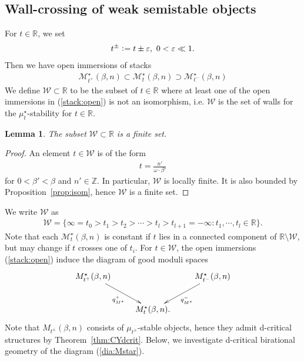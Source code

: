 \documentclass[11pt]{amsart}
\theoremstyle{plain}
\newtheorem{lem}[thm]{Lemma}
\theoremstyle{definition}
\theoremstyle{remark}
\newcommand{\mM}{\mathcal{M}}
\newcommand{\wW}{\mathcal{W}}
\begin{document}
\subsection{Wall-crossing of weak semistable objects}
For $t \in \mathbb{R}$, we set 
\begin{align*}
t^{\pm} \cneq t\pm \varepsilon, \ 0<\varepsilon \ll 1.
\end{align*}
Then we have open immersions of stacks
\begin{align}\label{stack:open}
\mM_{t^{+}}^{\star}(\beta, n) \subset \mM_t^{\star}(\beta, n)
\supset \mM_{t^{-}}^{\star}(\beta, n)
\end{align}
We define $\wW \subset \mathbb{R}$
to be the subset of $t \in \mathbb{R}$ where at least 
one of the 
open immersions in (\ref{stack:open}) is not an isomorphism, i.e. 
$\wW$ is the set of walls for the 
$\mu_t^{\star}$-stability for $t \in \mathbb{R}$. 
\begin{lem}\label{lem:Wfinite}
The subset $\wW \subset \mathbb{R}$ is a finite set.
\end{lem}
\begin{proof}
An element $t \in \wW$ is of the form
\begin{align*}
t=\frac{n'}{\omega \cdot \beta'}
\end{align*}
for $0<\beta'<\beta$ and $n' \in \mathbb{Z}$. 
In particular, $\wW$ is locally finite. 
It is also bounded by 
Proposition~\ref{prop:isom}, 
hence 
$\wW$ is a finite set. 
\end{proof}
We write $\wW$ as 
\begin{align}\label{W:wall}
\wW=\{\infty=t_0> t_1>t_2> \cdots >t_l >t_{l+1}=-\infty:
 t_1, \cdots, t_l \in \mathbb{R} \}. 
\end{align}
Note that each $\mM_t^{\star}(\beta, n)$ is constant 
if $t$ lies in a 
connected component of $\mathbb{R} \setminus \wW$, 
but may change if $t$ crosses one of $t_i$. 
For $t \in \wW$, 
the open immersions (\ref{stack:open})
induce the 
diagram of good moduli spaces
\begin{align}\label{dia:Mstar}
\xymatrix{
M_{t^{+}}^{\star}(\beta, n) \ar[rd]_-{q_{M^{\star}}^{+}} & & M_{t^{-}}^{\star}(\beta, n) 
\ar[ld]^-{q_{M^{\star}}^{-}} \\
& M_{t}^{\star}(\beta, n). &
}
\end{align}
Note that $M_{t^{\pm}}(\beta, n)$ consists of 
$\mu_{t^{\pm}}$-stable objects, hence they 
admit d-critical structures by Theorem~\ref{thm:CYdcrit}. 
Below, we investigate d-critical 
birational geometry of the diagram (\ref{dia:Mstar}). 
\end{document}
